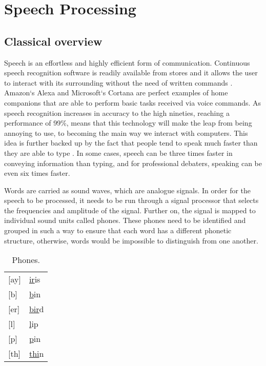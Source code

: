 \chapter{Speech Processing}\label{ch:speech_processing}

\section{Classical overview}
Speech is an effortless and highly efficient form of communication.
Continuous speech recognition software is readily available from stores and it allows the user to interact with its surrounding without the need of written commands
\cite[p.~396]{callan2003artificial}. Amazon`s Alexa 
\cite{Alexa} and Microsoft`s Cortana 
\cite{Cortana} are perfect examples of home companions that are able to perform basic tasks received via voice commands.
As speech recognition increases in accuracy to the high nineties, reaching a performance of 99\%,  means that this technology will make the leap from being annoying to use, to becoming the main way we interact with computers. 
This idea is further backed up by the fact that people tend to speak much faster than they are able to type \cite{Speed}.
In some cases, speech can be three times faster in conveying information than typing, and for professional debaters,
speaking can be even six times faster. \\


Words are carried as sound waves, which are analogue signals.
In order for the speech to be processed,
it needs to be run through a signal processor that selects the frequencies and amplitude of the signal.
Further on, the signal is mapped to individual sound units called phones.
These phones need to be identified and grouped in such a way to ensure that each word has a different phonetic structure,
otherwise, words would be impossible to distinguish from one another. \\

\begin{table}[H]
\centering
	\caption{Phones.}
	\label{my-label}
	\begin{tabular}{l l}
		{[}ay{]} & \underline{ir}is \\
		{[}b{]}  & \underline{b}in  \\
		{[}er{]} & \underline{bir}d \\
		{[}l{]}  & \underline{l}ip  \\
		{[}p{]}  & \underline{p}in  \\
		{[}th{]} & \underline{thi}n
	\end{tabular}
\end{table}

